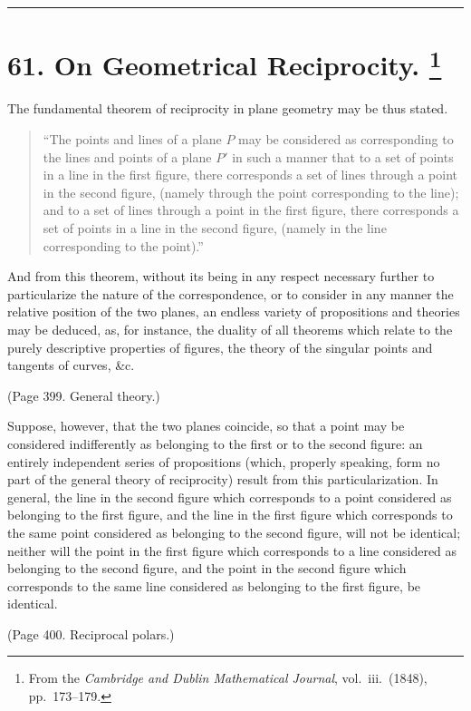 \documentclass[11pt,a4paper]{book}
\begin{document}
\bigskip
\hrule
\bigskip


\newpage
\section[On Geometrical Reciprocity]{%
61. On Geometrical Reciprocity.%
\footnote{From the \textit{Cambridge and Dublin Mathematical Journal}, vol.~iii.\ (1848), pp.~173--179.}}

The fundamental theorem of reciprocity in plane geometry may be thus stated.
\begin{quote}
``The points and lines of a plane $P$ may be considered as corresponding to the
lines and points of a plane $P'$ in such a manner that to a set of points in a line
in the first figure, there corresponds a set of lines through a point in the second
figure, (namely through the point corresponding to the line); and to a set of lines
through a point in the first figure, there corresponds a set of points in a line in the
second figure, (namely in the line corresponding to the point).''
\end{quote}

And from this theorem, without its being in any respect necessary further to
particularize the nature of the correspondence, or to consider in any manner the relative
position of the two planes, an endless variety of propositions and theories may be
deduced, as, for instance, the duality of all theorems which relate to the purely
descriptive properties of figures, the theory of the singular points and tangents of
curves, \&c.

(Page 399. General theory.)

Suppose, however, that the two planes coincide, so that a point may be considered
indifferently as belonging to the first or to the second figure: an entirely independent
series of propositions (which, properly speaking, form no part of the general theory of
reciprocity) result from this particularization. In general, the line in the second figure
which corresponds to a point considered as belonging to the first figure, and the line
in the first figure which corresponds to the same point considered as belonging to
the second figure, will not be identical; neither will the point in the first figure
which corresponds to a line considered as belonging to the second figure, and the point
in the second figure which corresponds to the same line considered as belonging to
the first figure, be identical.

(Page 400. Reciprocal polars.)
\end{document}
